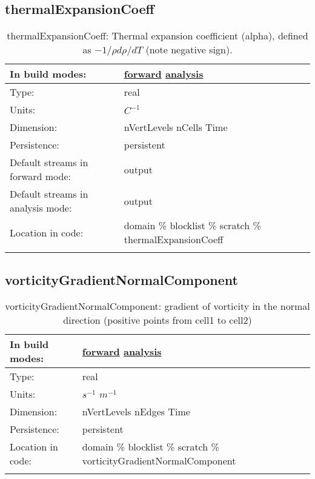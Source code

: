 \subsection[thermalExpansionCoeff]{thermalExpansionCoeff}
\label{subsec:var_sec_scratch_thermalExpansionCoeff}
\begin{center}
\begin{longtable}{| p{2.0in} | p{4.0in} |}
        \hline 
        In build modes: & \hyperref[subsec:forward_var_tab_scratch]{forward} \hyperref[subsec:analysis_var_tab_scratch]{analysis} \\
        \hline 
        Type: & real \\
        \hline 
        Units: & $C^{-1}$ \\
        \hline 
        Dimension: & nVertLevels nCells Time \\
        \hline 
        Persistence: & persistent \\
        \hline 
		 Default streams in forward mode: &  output \\
        \hline 
		 Default streams in analysis mode: &  output \\
        \hline 
		 Location in code: & domain \% blocklist \% scratch \% thermalExpansionCoeff \\
		 \hline 
    \caption{thermalExpansionCoeff:  Thermal expansion coefficient (alpha), defined as  $-1/\rho d\rho/dT$  (note negative sign).}
\end{longtable}
\end{center}
\subsection[vorticityGradientNormalComponent]{vorticityGradientNormalComponent}
\label{subsec:var_sec_scratch_vorticityGradientNormalComponent}
\begin{center}
\begin{longtable}{| p{2.0in} | p{4.0in} |}
        \hline 
        In build modes: & \hyperref[subsec:forward_var_tab_scratch]{forward} \hyperref[subsec:analysis_var_tab_scratch]{analysis} \\
        \hline 
        Type: & real \\
        \hline 
        Units: & $s^{-1}$ $m^{-1}$ \\
        \hline 
        Dimension: & nVertLevels nEdges Time \\
        \hline 
        Persistence: & persistent \\
        \hline 
		 Location in code: & domain \% blocklist \% scratch \% vorticityGradientNormalComponent \\
		 \hline 
    \caption{vorticityGradientNormalComponent: gradient of vorticity in the normal direction (positive points from cell1 to cell2)}
\end{longtable}
\end{center}
